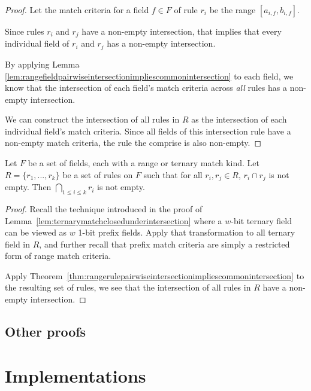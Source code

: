 \documentclass[acmsmall]{acmart}
\begin{document}
\begin{proof}
Let the match criteria for a field $f \in F$ of rule $r_i$ be
the range $[a_{i,f}, b_{i,f}]$.

Since rules $r_i$ and $r_j$ have a non-empty intersection,
that implies that every individual field of $r_i$ and $r_j$
has a non-empty intersection.

By applying Lemma~
\ref{lem:rangefieldpairwiseintersectionimpliescommonintersection}
to each field, we know that the intersection of each field's
match criteria across {\em all} rules has a non-empty intersection.

We can construct the intersection of all rules in $R$ as
the intersection of each individual field's match criteria.
Since all fields of this intersection rule have a non-empty
match criteria, the rule the comprise is also non-empty.
\end{proof}


\begin{theorem}
\label{thm:ternaryrulepairwiseintersectionimpliescommonintersection}
Let $F$ be a set of fields, each with a range or ternary match kind.
Let $R = \{r_1, ..., r_k\}$ be a set of rules on $F$
such that for all $r_i, r_j \in R$, $r_i \cap r_j$ is not empty.
Then $\bigcap_{1 \leq i \leq k} r_i$ is not empty.
\end{theorem}

\begin{proof}
Recall the technique introduced in the proof of
Lemma~\ref{lem:ternarymatchclosedunderintersection}
where a $w$-bit ternary field can be viewed as
$w$ 1-bit prefix fields.
Apply that transformation to all ternary field in $R$,
and further recall that prefix match criteria are simply a restricted
form of range match criteria.

Apply Theorem~\ref{thm:rangerulepairwiseintersectionimpliescommonintersection}
to the resulting set of rules,
we see that the intersection of all rules in $R$
have a non-empty intersection.
\end{proof}

\begin{theorem}
\label{thm:addnewfilterpreservesclosedunderintersection}
\end{theorem}


\subsection{Other proofs}


\section{Implementations}
\end{document}
